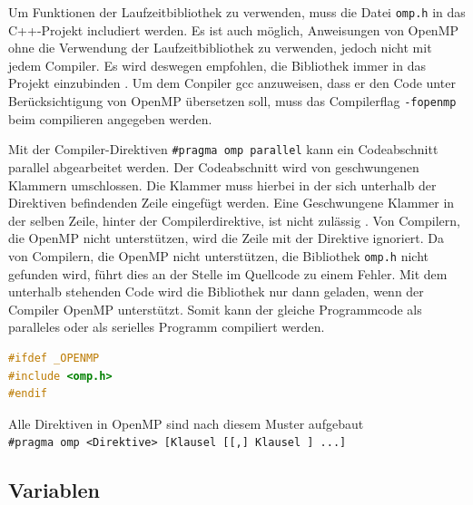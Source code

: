 \documentclass[../main.tex]{subfiles}
\begin{document}
Um Funktionen der Laufzeitbibliothek zu verwenden, muss die Datei \texttt{omp.h} in das C++-Projekt includiert werden. Es ist auch möglich, Anweisungen von OpenMP ohne die Verwendung der Laufzeitbibliothek zu verwenden, jedoch nicht mit jedem Compiler. Es wird deswegen empfohlen, die Bibliothek immer in das Projekt einzubinden \cite{articleOpenMP}. Um dem Conpiler gcc anzuweisen, dass er den Code unter Berücksichtigung von OpenMP übersetzen soll, muss das Compilerflag \texttt{-fopenmp} beim compilieren angegeben werden. \par
Mit der Compiler-Direktiven \texttt{\#pragma\ omp\ parallel} kann ein Codeabschnitt parallel abgearbeitet werden. Der Codeabschnitt wird von geschwungenen Klammern umschlossen. Die Klammer muss hierbei in der sich unterhalb der Direktiven befindenden Zeile eingefügt werden. Eine Geschwungene Klammer in der selben Zeile, hinter der Compilerdirektive, ist nicht zulässig \cite{articleOpenMP}. Von Compilern, die OpenMP nicht unterstützen, wird die Zeile mit der Direktive ignoriert. Da von Compilern, die OpenMP nicht unterstützen, die Bibliothek \texttt{omp.h} nicht gefunden wird, führt dies an der Stelle im Quellcode zu einem Fehler. Mit dem unterhalb stehenden Code wird die Bibliothek nur dann geladen, wenn der Compiler OpenMP unterstützt. Somit kann der gleiche Programmcode als paralleles oder als serielles Programm compiliert werden.
\begin{lstlisting}[language=c++, caption=Includieren der Bibliothek omp.h, captionpos=b, label=listing:include_omp, frame=single, linewidth=\textwidth, breaklines=true]
#ifdef _OPENMP
#include <omp.h>
#endif
\end{lstlisting}
Alle Direktiven in OpenMP sind nach diesem Muster aufgebaut \texttt{\#pragma\ omp\ <Direktive>\ [Klausel\ [[,]\ Klausel\ ]\ ...]}

\subsection{Variablen}
\end{document}

